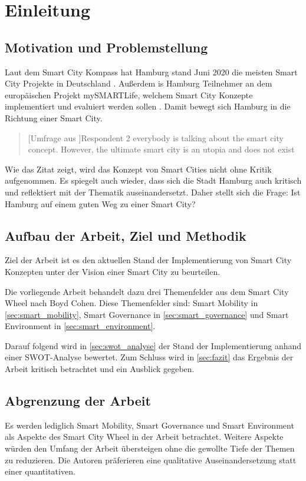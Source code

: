 \section{Einleitung}

\subsection{Motivation und Problemstellung}
Laut dem Smart City Kompass hat Hamburg stand Juni 2020 die meisten Smart City Projekte in Deutschland \autocite[vgl.][]{SmartCityKompass.ODA}.
Außerdem is Hamburg Teilnehmer an dem europäischen Projekt mySMARTLife, welchem Smart City Konzepte implementiert und evaluiert werden sollen \autocite[vgl.][S. 1ff.]{Hamburg.OD}.
Damit bewegt sich Hamburg in die Richtung einer Smart City.

\begin{quote}[Umfrage aus \autocite[S. 126]{Spil.2017}]{Respondent 2}
	\glqq everybody is talking about the smart city concept. However, the ultimate smart city is an utopia and does not exist\grqq
\end{quote}

Wie das Zitat zeigt, wird das Konzept von Smart Cities nicht ohne Kritik aufgenommen.
Es spiegelt auch wieder, dass sich die Stadt Hamburg auch kritisch und reflektiert mit der Thematik auseinandersetzt.
Daher stellt sich die Frage: Ist Hamburg auf einem guten Weg zu einer Smart City?

\subsection{Aufbau der Arbeit, Ziel und Methodik}
Ziel der Arbeit ist es den aktuellen Stand der Implementierung von Smart City Konzepten unter der Vision einer Smart City zu beurteilen.

Die vorliegende Arbeit behandelt dazu drei Themenfelder aus dem Smart City Wheel nach Boyd Cohen.
Diese Themenfelder sind: Smart Mobility in \autoref{sec:smart_mobility}, Smart Governance in \autoref{sec:smart_governance} und Smart Environment in \autoref{sec:smart_environment}.

Darauf folgend wird in \autoref{sec:swot_analyse} der Stand der Implementierung anhand einer SWOT-Analyse bewertet.
Zum Schluss wird in \autoref{sec:fazit} das Ergebnis der Arbeit kritisch betrachtet und ein Ausblick gegeben.

\subsection{Abgrenzung der Arbeit}
Es werden lediglich Smart Mobility, Smart Governance und Smart Environment als Aspekte des Smart City Wheel in der Arbeit betrachtet.
Weitere Aspekte würden den Umfang der Arbeit übersteigen ohne die gewollte Tiefe der Themen zu reduzieren.
Die Autoren präferieren eine qualitative Auseinandersetzung statt einer quantitativen.